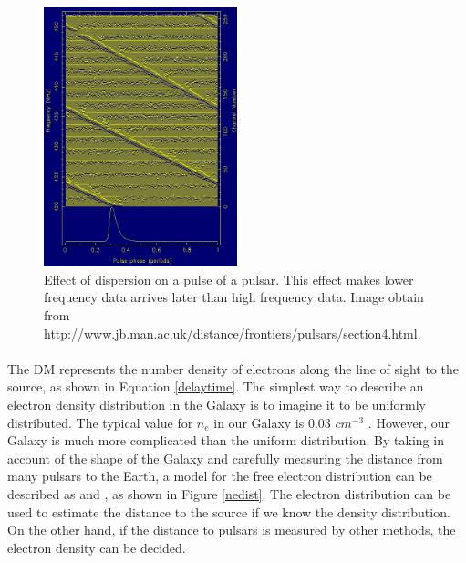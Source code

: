 \documentclass[thesis_msc.tex]{subfiles}
\begin{document}
\begin{figure}[h] \centering
\includegraphics[width=0.5\textwidth]{figures/disp.png}
\caption{Effect of dispersion on a pulse of a pulsar. This effect makes lower frequency data arrives later than high frequency data. Image obtain from http://www.jb.man.ac.uk/distance/frontiers/pulsars/section4.html.  }
\label{DMplot}
\end{figure}
   \paragraph{} The DM represents the number density of electrons along the line of sight to the source, as shown in Equation \ref{delaytime}. The simplest way to describe an electron density distribution in the Galaxy is to imagine it to be uniformly distributed. The typical value for $n_e$ in our Galaxy is 0.03 $cm^{-3}$ \citep{ables1976hydrogen}. However, our Galaxy is much more complicated than the uniform distribution. By taking in account of the shape of the Galaxy and carefully measuring the distance from many pulsars to the Earth, a model for the free electron distribution can be described as \citep{cordes2003ne2001} and \citep{yao2017new} , as shown in Figure \ref{nedist}.  The electron distribution can be used to estimate the distance to the source if we know the density distribution. On the other hand, if the distance to pulsars is measured by other methods, the electron density can be decided. 
   
\end{document}
